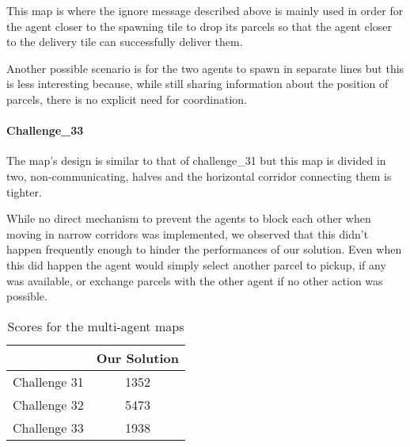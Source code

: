 This map is where the ignore message described above is mainly used in order for the agent closer to the spawning tile to drop its parcels so that the agent closer to the delivery tile can successfully deliver them.

Another possible scenario is for the two agents to spawn in separate lines but this is less interesting because, while still sharing information about the position of parcels, there is no explicit need for coordination.
\paragraph{Challenge\_33} The map's design is similar to that of challenge\_31 but this map is divided in two, non-communicating, halves and the horizontal corridor connecting them is tighter.

While no direct mechanism to prevent the agents to block each other when moving in narrow corridors was implemented, we observed that this didn't happen frequently enough to hinder the performances of our solution. Even when this did happen the agent would simply select another parcel to pickup, if any was available, or exchange parcels with the other agent if no other action was possible.

\begin{table}
    \centering
    \begin{tabular}{c || c} \hline
                    &  Our Solution \\ \hline
    Challenge 31    &  1352         \\
    Challenge 32    &  5473         \\  
    Challenge 33    &  1938         \\  \hline 
    \end{tabular}
    \caption{Scores for the multi-agent maps}
    \label{tab:multi_agent}
\end{table}
